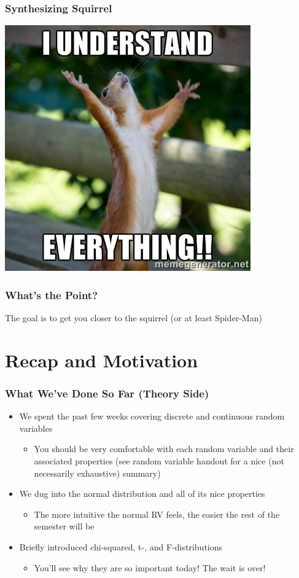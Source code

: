 \documentclass{beamer}
\begin{document}
\begin{frame}
\frametitle{Synthesizing Squirrel}
\centering
\includegraphics[scale=0.7]{./images/iUnderstand.jpg}
\end{frame}

\begin{frame}
\frametitle{What's the Point?}
The goal is to get you closer to the squirrel (or at least Spider-Man)
\end{frame}

\section{Recap and Motivation}
\begin{frame}
\frametitle{What We've Done So Far (Theory Side)}

\begin{itemize}[<+-|alert@+>]
\item We spent the past few weeks covering discrete and continuous random variables
	\begin{itemize}
		\item You should be very comfortable with each random variable and their associated properties (see random variable handout for a nice (not necessarily exhaustive) summary)
	\end{itemize}
	\item We dug into the normal distribution and all of its nice properties
	\begin{itemize}
		\item The more intuitive the normal RV feels, the easier the rest of the semester will be
	\end{itemize}
	\item Briefly introduced chi-squared, t-, and F-distributions
	\begin{itemize}
		\item You'll see why they are so important today! The wait is over!
	\end{itemize}
\end{itemize}
\end{frame}
\end{document}
